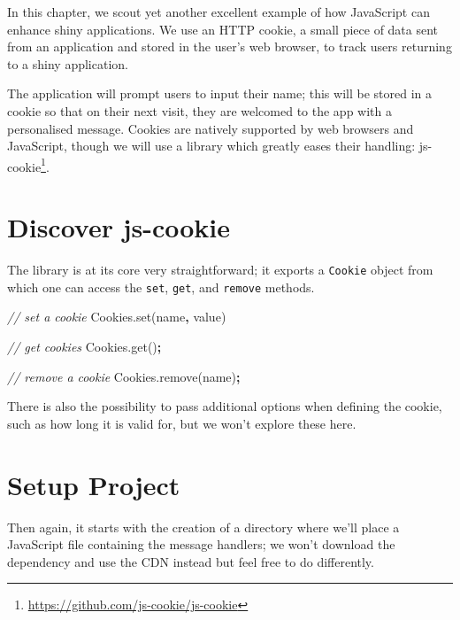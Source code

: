\documentclass[
  10pt,
]{krantz}
\makeatletter
\newenvironment{Shaded}{\begin{snugshade}}{\end{snugshade}}
\newcommand{\AttributeTok}[1]{\textcolor[rgb]{0.61,0.61,0.61}{#1}}
\newcommand{\CommentTok}[1]{\textcolor[rgb]{0.37,0.37,0.37}{\textit{#1}}}
\newcommand{\NormalTok}[1]{#1}
\newcommand{\OperatorTok}[1]{\textcolor[rgb]{0.43,0.43,0.43}{\textbf{#1}}}
\newcommand{\StringTok}[1]{\textcolor[rgb]{0.5,0.5,0.5}{#1}}
\newcommand{\VariableTok}[1]{\textcolor[rgb]{0,0,0}{#1}}
\renewcommand{\href}[2]{#2\footnote{\url{#1}}}
\newenvironment{kframe}{%
\medskip{}
\setlength{\fboxsep}{.8em}
 \def\at@end@of@kframe{}%
 \ifinner\ifhmode%
  \def\at@end@of@kframe{\end{minipage}}%
  \begin{minipage}{\columnwidth}%
 \fi\fi%
 \def\FrameCommand##1{\hskip\@totalleftmargin \hskip-\fboxsep
 \colorbox{shadecolor}{##1}\hskip-\fboxsep
     \hskip-\linewidth \hskip-\@totalleftmargin \hskip\columnwidth}%
 \MakeFramed {\advance\hsize-\width
   \@totalleftmargin\z@ \linewidth\hsize
   \@setminipage}}%
 {\par\unskip\endMakeFramed%
 \at@end@of@kframe}
\renewenvironment{Shaded}{\begin{kframe}}{\end{kframe}}
\makeatother
\begin{document}
In this chapter, we scout yet another excellent example of how JavaScript can enhance shiny applications. We use an HTTP cookie, a small piece of data sent from an application and stored in the user's web browser, to track users returning to a shiny application.

The application will prompt users to input their name; this will be stored in a cookie so that on their next visit, they are welcomed to the app with a personalised message. Cookies are natively supported by web browsers and JavaScript, though we will use a library which greatly eases their handling: \href{https://github.com/js-cookie/js-cookie}{js-cookie}.

\hypertarget{shiny-cookies-discover}{%
\section{Discover js-cookie}\label{shiny-cookies-discover}}

The library is at its core very straightforward; it exports a \texttt{Cookie} object from which one can access the \texttt{set}, \texttt{get}, and \texttt{remove} methods.

\begin{Shaded}
\begin{Highlighting}[]
\CommentTok{// set a cookie}
\VariableTok{Cookies}\NormalTok{.}\AttributeTok{set}\NormalTok{(}\StringTok{\textquotesingle{}name\textquotesingle{}}\OperatorTok{,} \StringTok{\textquotesingle{}value\textquotesingle{}}\NormalTok{)}

\CommentTok{// get cookies}
\VariableTok{Cookies}\NormalTok{.}\AttributeTok{get}\NormalTok{()}\OperatorTok{;}

\CommentTok{// remove a cookie}
\VariableTok{Cookies}\NormalTok{.}\AttributeTok{remove}\NormalTok{(}\StringTok{\textquotesingle{}name\textquotesingle{}}\NormalTok{)}\OperatorTok{;}
\end{Highlighting}
\end{Shaded}

There is also the possibility to pass additional options when defining the cookie, such as how long it is valid for, but we won't explore these here.

\hypertarget{shiny-cookies-setup}{%
\section{Setup Project}\label{shiny-cookies-setup}}

Then again, it starts with the creation of a directory where we'll place a JavaScript file containing the message handlers; we won't download the dependency and use the CDN instead but feel free to do differently.
\end{document}
